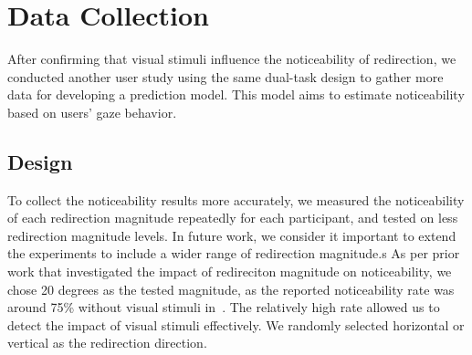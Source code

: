 \section{Data Collection}
\label{section:datacollection}
After confirming that visual stimuli influence the noticeability of redirection, we conducted another user study using the same dual-task design to gather more data for developing a prediction model. 
This model aims to estimate noticeability based on users' gaze behavior.


\subsection{Design}

To collect the noticeability results more accurately, we measured the noticeability of each redirection magnitude repeatedly for each participant, and tested on less redirection magnitude levels.
In future work, we consider it important to extend the experiments to include a wider range of redirection magnitude.s 
As per prior work that investigated the impact of redireciton magnitude on noticeability, we chose 20 degrees as the tested magnitude, as the reported noticeability rate was around 75\% without visual stimuli in~\cite{li2022modeling}. 
The relatively high rate allowed us to detect the impact of visual stimuli effectively.
We randomly selected horizontal or vertical as the redirection direction.

